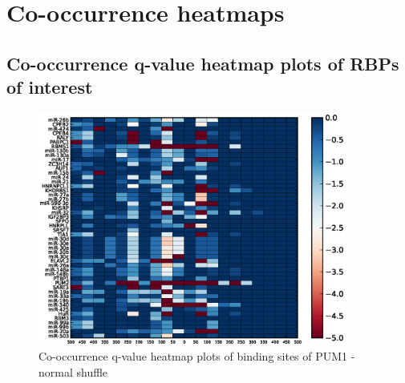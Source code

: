 \chapter{Co-occurrence heatmaps}
\label{chp:appendixB}

\section{Co-occurrence q-value heatmap plots of RBPs of interest}

\clearpage
\begin{figure}
   	\includegraphics[width=0.9\textwidth]{appendix1/figures/PUM1_normal_expressed_heatmap_qvalues0.eps}
   	\caption{Co-occurrence q-value heatmap plots of binding sites of PUM1 - normal shuffle}
\end{figure}

